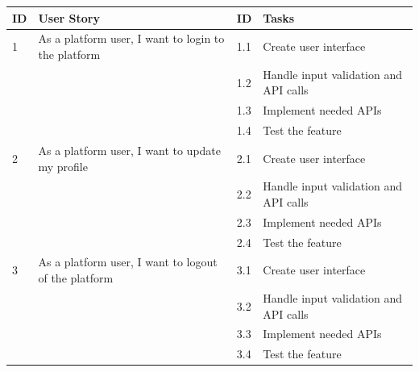 \begin{longtable}{|p{1cm}|p{7cm}|p{1cm}|p{7cm}|}
    \hline
    \rowcolor{green!20} \textbf{ID} & \textbf{User Story}                                           & \textbf{ID} & \textbf{Tasks}                        \\ \hline
    1                               & As a platform user, I want to login to the platform           & 1.1         & Create user interface                 \\ \cline{3-4}
                                    &                                                               & 1.2         & Handle input validation and API calls \\ \cline{3-4}
                                    &                                                               & 1.3         & Implement needed APIs                 \\ \cline{3-4}
                                    &                                                               & 1.4         & Test the feature                      \\ \hline
    2                               & As a platform user, I want to update my profile               & 2.1         & Create user interface                 \\ \cline{3-4}
                                    &                                                               & 2.2         & Handle input validation and API calls \\ \cline{3-4}
                                    &                                                               & 2.3         & Implement needed APIs                 \\ \cline{3-4}
                                    &                                                               & 2.4         & Test the feature                      \\ \hline
    3                               & As a platform user, I want to logout of the platform          & 3.1         & Create user interface                 \\ \cline{3-4}
                                    &                                                               & 3.2         & Handle input validation and API calls \\ \cline{3-4}
                                    &                                                               & 3.3         & Implement needed APIs                 \\ \cline{3-4}
                                    &                                                               & 3.4         & Test the feature                      \\ \hline

\end{longtable}
